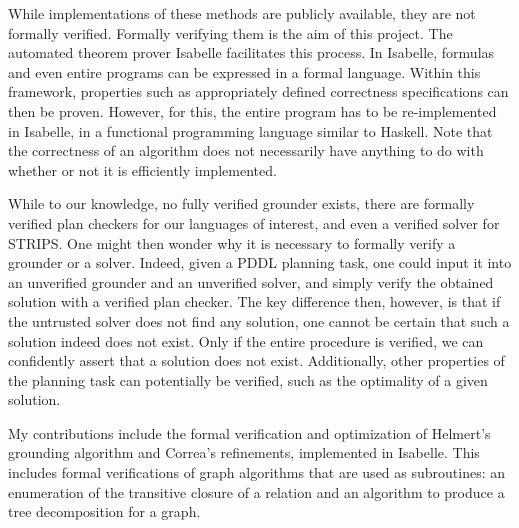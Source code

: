 While implementations of these methods are publicly available, they are not formally verified. Formally verifying them is the aim of this project.
The automated theorem prover Isabelle facilitates this process. In Isabelle, formulas and even entire programs can be expressed in a formal language. Within this framework, properties such as appropriately defined correctness specifications can then be proven. However, for this, the entire program has to be re-implemented in Isabelle, in a functional programming language similar to Haskell. Note that the correctness of an algorithm does not necessarily have anything to do with whether or not it is efficiently implemented.

While to our knowledge, no fully verified grounder exists, there are formally verified plan checkers for our languages of interest, and even a verified solver for STRIPS. One might then wonder why it is necessary to formally verify a grounder or a solver. Indeed, given a PDDL planning task, one could input it into an unverified grounder and an unverified solver, and simply verify the obtained solution with a verified plan checker.
The key difference then, however, is that if the untrusted solver does not find any solution, one cannot be certain that such a solution indeed does not exist. Only if the entire procedure is verified, we can confidently assert that a solution does not exist.
Additionally, other properties of the planning task can potentially be verified, such as the optimality of a given solution.

My contributions include the formal verification and optimization of Helmert's grounding algorithm and Correa's refinements, implemented in Isabelle. This includes formal verifications of graph algorithms that are used as subroutines: an enumeration of the transitive closure of a relation and an algorithm to produce a tree decomposition for a graph.
